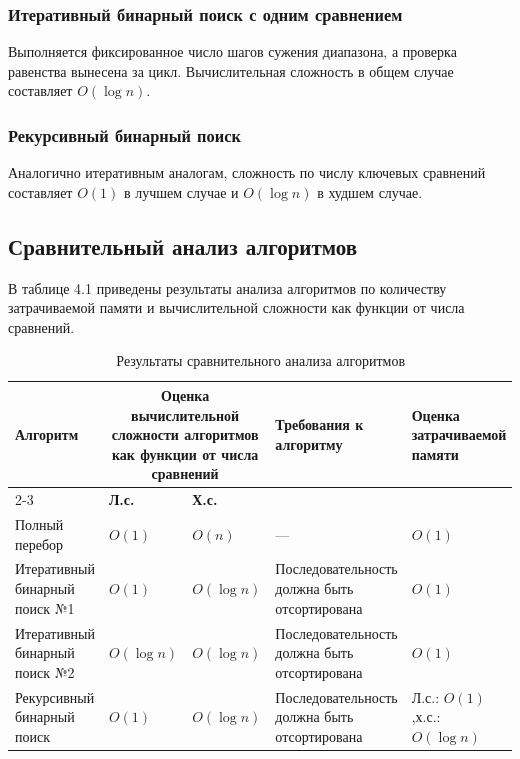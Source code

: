 \documentclass[14pt,a4paper]{extarticle}
\begin{document}
\subsubsection{Итеративный бинарный поиск с одним сравнением}
Выполняется фиксированное число шагов сужения диапазона, а проверка равенства вынесена за цикл. Вычислительная сложность в общем случае составляет $O(\log n)$.

\subsubsection{Рекурсивный бинарный поиск}
Аналогично итеративным аналогам, сложность по числу ключевых сравнений составляет $O(1)$ в лучшем случае и $O(\log n)$ в худшем случае.

\subsection{Сравнительный анализ алгоритмов}
В таблице 4.1 приведены результаты анализа алгоритмов по количеству затрачиваемой памяти и вычислительной сложности как функции от числа сравнений.

\begin{table}[H]\centering
\caption{Результаты сравнительного анализа алгоритмов}\label{tab:compare}
\small
\begin{tabularx}{\textwidth}{|p{3.5cm}|p{1.8cm}|p{1.8cm}|p{3.9cm}|p{3.3cm}|}\hline
\multirow{2}{*}{\parbox{3.5cm}{\bfseries Алгоритм}}
  & \multicolumn{2}{c|}{\parbox{3cm}{\centering\bfseries Оценка вычислительной сложности алгоритмов как функции от числа сравнений}}
  & \multirow{2}{*}{\parbox{3.9cm}{\bfseries Требования к\\ алгоритму}}
  & \multirow{2}{*}{\parbox{3.3cm}{\centering\bfseries Оценка\\ затрачиваемой\\ памяти}}\\\cline{2-3}
  & \bfseries Л.с. & \bfseries Х.с. & & \\\hline\hline
Полный перебор & $O(1)$ & $O(n)$ & --- & $O(1)$\\\hline
Итеративный бинарный поиск №1 & $O(1)$ & $O(\log n)$ & Последовательность должна быть отсортирована & $O(1)$\\\hline
Итеративный бинарный поиск №2 & $O(\log n)$ & $O(\log n)$ & Последовательность должна быть отсортирована & $O(1)$\\\hline
Рекурсивный бинарный поиск & $O(1)$ & $O(\log n)$ & Последовательность должна быть отсортирована & Л.с.: $O(1)$,\newline х.с.: $O(\log n)$\\\hline
\end{tabularx}
\end{table}
\end{document}
